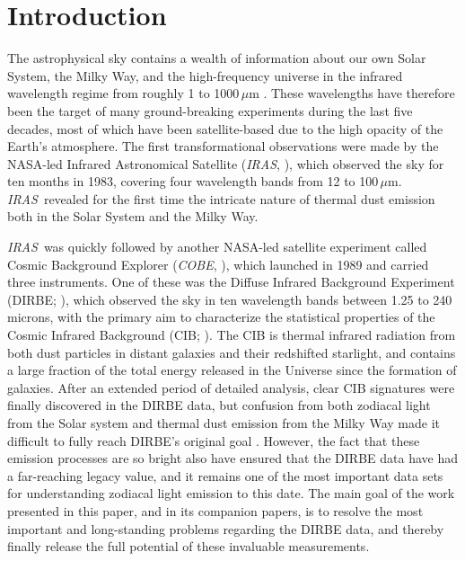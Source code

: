 \documentclass{aa}
\def\COBE{\textit{COBE}}
\def\IRAS{\textit{{IRAS}}}
\begin{document}

   \maketitle

\setcounter{tocdepth}{2}
\tableofcontents
   
\section{Introduction}


The astrophysical sky contains a wealth of information about our own Solar System, the Milky Way, and the high-frequency universe in the infrared wavelength regime from roughly 1 to 1000\,$\mu$m \citep[e.g.,][]{johnson:1966,soifer:1987,gardner:2006}. These wavelengths have therefore been the target of many ground-breaking experiments during the last five decades, most of which have been satellite-based due to the high opacity of the Earth's atmosphere. The first transformational observations were made by the NASA-led Infrared Astronomical Satellite (\IRAS, \citealt{neugebauer:1984}), which observed the sky for ten months in 1983, covering four wavelength bands from 12 to 100$\,\mu$m. \IRAS\ revealed for the first time the intricate nature of thermal dust emission both in the Solar System and the Milky Way.

\IRAS\ was quickly followed by another NASA-led satellite experiment called Cosmic Background Explorer (\COBE, \citealt{boggess92}), which launched in 1989 and carried three instruments. One of these was the Diffuse Infrared Background Experiment (DIRBE; \citealp{hauser1998}), which observed the sky in ten wavelength bands between 1.25 to 240 microns, with the primary aim to characterize the statistical properties of the Cosmic Infrared Background (CIB; \citealp{partridge1967}). The CIB is thermal infrared radiation from both dust particles in distant galaxies and their redshifted starlight, and contains a large fraction of the total energy released in the Universe since the formation of galaxies. After an extended period of detailed analysis, clear CIB signatures were finally discovered in the DIRBE data, but confusion from both zodiacal light from the Solar system and thermal dust emission from the Milky Way made it difficult to fully reach DIRBE's original goal \citep{arendt1998,hauser1998,kelsall1998}. However, the fact that these emission processes are so bright also have ensured that the DIRBE data have had a far-reaching legacy value, and it remains one of the most important data sets for understanding zodiacal light emission to this date. The main goal of the work presented in this paper, and in its companion papers, is to resolve the most important and long-standing problems regarding the DIRBE data, and thereby finally release the full potential of these invaluable measurements.
\end{document}
